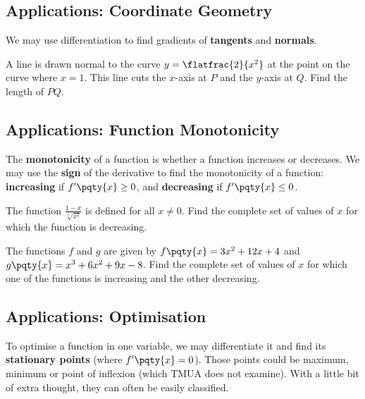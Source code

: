 \documentclass{article}
\begin{document}
\subsection{Applications: Coordinate Geometry}

We may use differentiation to find gradients of \textbf{tangents} and \textbf{normals}.


\begin{example}[TMUA 2016 P1 Q3]
    A line is drawn normal to the curve \(y = \flatfrac{2}{x^2}\) at the point on the curve where \(x = 1\). This line cuts the \(x\)-axis at \(P\) and the \(y\)-axis at \(Q\). Find the length of \(PQ\).
\end{example}

\subsection{Applications: Function Monotonicity}

The \textbf{monotonicity} of a function is whether a function increases or decreases. We may use the \textbf{sign} of the derivative to find the monotonicity of a function: \textbf{increasing} if \(f'\pqty{x} \geq 0\), and \textbf{decreasing} if \(f'\pqty{x} \leq 0\).

\begin{example}[TMUA 2016 P1 Q18]
    The function \(\frac{1 - x}{\sqrt[3]{x^2}}\) is defined for all \(x \neq 0\). Find the complete set of values of \(x\) for which the function is decreasing.
\end{example}

\begin{example}[TMUA 2017 P1 Q16]
    The functions \(f\) and \(g\) are given by \(f\pqty{x} = 3 x^2 + 12 x + 4\) and \(g\pqty{x} = x^3 + 6 x^2 + 9x - 8\). Find the complete set of values of \(x\) for which one of the functions is increasing and the other decreasing.
\end{example}

\subsection{Applications: Optimisation}

To optimise a function in one variable, we may differentiate it and find its \textbf{stationary points} (where \(f'\pqty{x} = 0\)). Those points could be maximum, minimum or point of inflexion (which TMUA does not examine). With a little bit of extra thought, they can often be easily classified.
\end{document}
